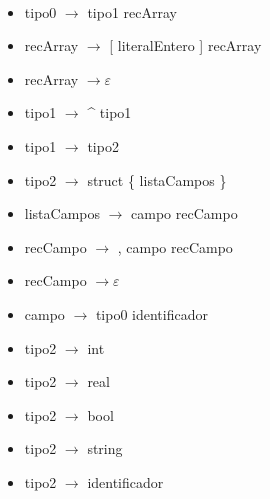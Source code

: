 \documentclass[11pt]{article}
\begin{document}
        \
        \begin{itemize}
            \item tipo0 $\rightarrow$ tipo1 recArray
            \item recArray $\rightarrow$ [ literalEntero ] recArray
            \item recArray $\rightarrow \varepsilon$
            \item tipo1 $\rightarrow$ \^{} tipo1
            \item tipo1 $\rightarrow$ tipo2
            \item tipo2 $\rightarrow$ struct \{ listaCampos \}
            \item listaCampos $\rightarrow$ campo recCampo
            \item recCampo $\rightarrow$ , campo recCampo
            \item recCampo $\rightarrow \varepsilon$
            \item campo $\rightarrow$ tipo0 identificador
            \item tipo2 $\rightarrow$ int
            \item tipo2 $\rightarrow$ real
            \item tipo2 $\rightarrow$ bool
            \item tipo2 $\rightarrow$ string
            \item tipo2 $\rightarrow$ identificador
        \end{itemize}
        \
\end{document}
